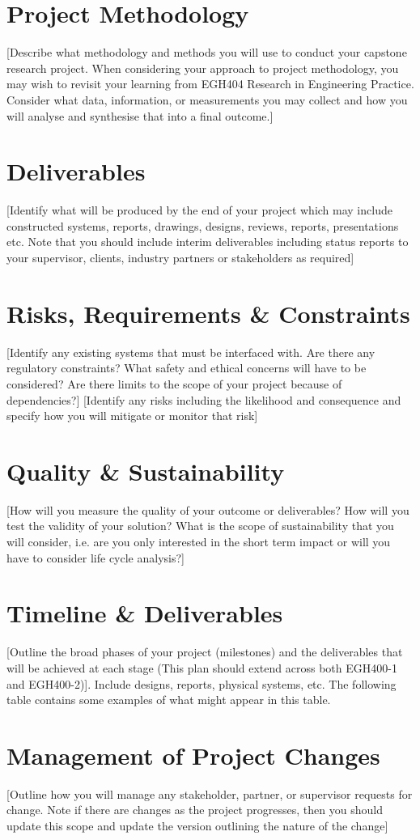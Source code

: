 \documentclass[11pt]{article}
\begin{document}
\section{Project Methodology}
[Describe what methodology and methods you will use to conduct your capstone research project.
When considering your approach to project methodology, you may wish to revisit your learning from
EGH404 Research in Engineering Practice. Consider what data, information, or measurements you
may collect and how you will analyse and synthesise that into a final outcome.]

\section{Deliverables}
[Identify what will be produced by the end of your project which may include constructed systems,
reports, drawings, designs, reviews, reports, presentations etc. Note that you should include interim
deliverables including status reports to your supervisor, clients, industry partners or stakeholders as
required]

\section{Risks, Requirements \& Constraints}
[Identify any existing systems that must be interfaced with. Are there any regulatory constraints?
What safety and ethical concerns will have to be considered? Are there limits to the scope of your
project because of dependencies?]
[Identify any risks including the likelihood and consequence and specify how you will mitigate or
monitor that risk]

\section{Quality \& Sustainability}
[How will you measure the quality of your outcome or deliverables? How will you test the validity of
your solution? What is the scope of sustainability that you will consider, i.e. are you only interested in
the short term impact or will you have to consider life cycle analysis?]

\section{Timeline \& Deliverables}
[Outline the broad phases of your project (milestones) and the deliverables that will be achieved at
each stage (This plan should extend across both EGH400-1 and EGH400-2)]. Include designs, reports,
physical systems, etc. The following table contains some examples of what might appear in this table.



\section{Management of Project Changes}
[Outline how you will manage any stakeholder, partner, or supervisor requests for change. Note if
there are changes as the project progresses, then you should update this scope and update the
version outlining the nature of the change]
\end{document}
